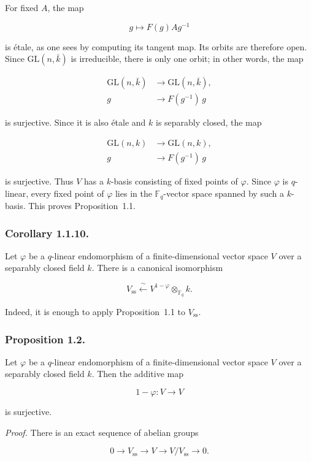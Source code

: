 For fixed $A$, the map

\begin{equation}\tag{1.1.7}
g\longmapsto F(g)Ag^{-1}
\end{equation}

is étale, as one sees by computing its tangent map. Its orbits are therefore
open. Since $\mathrm{GL}(n,\bar k)$ is irreducible, there is only one orbit;
in other words, the map

\begin{equation}\tag{1.1.8}
\begin{aligned}
\mathrm{GL}(n,\bar k)&\longrightarrow\mathrm{GL}(n,\bar k),\\
g&\longrightarrow F(g^{-1})\,g
\end{aligned}
\end{equation}

is surjective. Since it is also étale and $k$ is separably closed, the map

\begin{equation}\tag{1.1.9}
\begin{aligned}
\mathrm{GL}(n,k)&\longrightarrow\mathrm{GL}(n,k),\\
g&\longrightarrow F(g^{-1})\,g
\end{aligned}
\end{equation}

is surjective. Thus $V$ has a $k$-basis consisting of fixed points of
$\varphi$. Since $\varphi$ is $q$-linear, every fixed point of $\varphi$ lies
in the $\mathbb F_q$-vector space spanned by such a $k$-basis. This proves
Proposition~1.1.

\subsubsection*{Corollary 1.1.10.}
Let $\varphi$ be a $q$-linear endomorphism of a finite-dimensional vector
space $V$ over a separably closed field $k$. There is a canonical
isomorphism

\begin{equation}\tag{1.1.11}
V_{\mathrm{ss}}\xleftarrow{\ \sim\ }
V^{1-\varphi}\otimes_{\mathbb F_q}k.
\end{equation}

Indeed, it is enough to apply Proposition~1.1 to $V_{\mathrm{ss}}$.

\subsubsection*{Proposition 1.2.}
Let $\varphi$ be a $q$-linear endomorphism of a finite-dimensional vector
space $V$ over a separably closed field $k$. Then the additive map

\[
1-\varphi:V\longrightarrow V
\]

is surjective.

\medskip
\noindent\emph{Proof.}
There is an exact sequence of abelian groups

\[
0\longrightarrow V_{\mathrm{ss}}\longrightarrow V
\longrightarrow V/V_{\mathrm{ss}}\longrightarrow0.
\]
